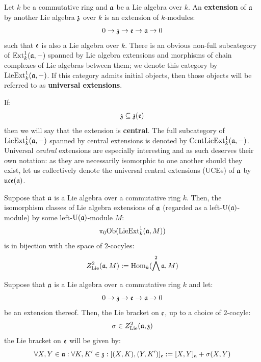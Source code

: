        \begin{definition}
            Let $k$ be a commutative ring and $\mathfrak{a}$ be a Lie algebra over $k$. An \textbf{extension} of $\mathfrak{a}$ by another Lie algebra $\mathfrak{z}$ over $k$ is an extension of $k$-modules:
                $$0 \to \mathfrak{z} \to \mathfrak{e} \to \mathfrak{a} \to 0$$
            such that $\mathfrak{e}$ is also a Lie algebra over $k$. There is an obvious non-full subcategory of $\mathrm{Ext}^1_k(\mathfrak{a}, -)$ spanned by Lie algebra extensions and morphisms of chain complexes of Lie algebras between them; we denote this category by $\mathrm{Lie}\mathrm{Ext}^1_k(\mathfrak{a}, -)$. If this category admits initial objects, then those objects will be referred to as \textbf{universal extensions}.
            
            If:
                $$\mathfrak{z} \subseteq \mathfrak{z}(\mathfrak{e})$$
            then we will say that the extension is \textbf{central}. The full subcategory of $\mathrm{Lie}\mathrm{Ext}^1_k(\mathfrak{a}, -)$ spanned by central extensions is denoted by $\mathrm{Cent}\mathrm{Lie}\mathrm{Ext}^1_k(\mathfrak{a}, -)$. Universal \textit{central} extensions are especially interesting and as such deserves their own notation: as they are necessarily isomorphic to one another should they exist, let us collectively denote the universal central extensions (UCEs) of $\mathfrak{a}$ by $\mathfrak{uce}(\mathfrak{a})$.
        \end{definition}
        \begin{lemma}[$Z^2_{\Lie}$ = all extensions]
            Suppose that $\mathfrak{a}$ is a Lie algebra over a commutative ring $k$. Then, the isomorphism classes of Lie algebra extensions of $\mathfrak{a}$ (regarded as a left-$\mathrm{U}(\mathfrak{a})$-module) by some left-$\mathrm{U}(\mathfrak{a})$-module $M$:
                $$\pi_0\mathrm{Ob}( \mathrm{Lie}\mathrm{Ext}^1_k(\mathfrak{a}, M) )$$
            is in bijection with the space of $2$-cocyles:
                $$Z^2_{\mathrm{Lie}}(\mathfrak{a}, M) := \mathrm{Hom}_k( \bigwedge^2 \mathfrak{a}, M )$$
        \end{lemma}
        \begin{corollary}[Extensions = $2$-cocycles]
            Suppose that $\mathfrak{a}$ is a Lie algebra over a commutative ring $k$ and let:
                $$0 \to \mathfrak{z} \to \mathfrak{e} \to \mathfrak{a} \to 0$$
            be an extension thereof. Then, the Lie bracket on $\mathfrak{e}$, up to a choice of $2$-cocyle:
                $$\sigma \in Z^2_{\mathrm{Lie}}(\mathfrak{a}, \mathfrak{z})$$
            the Lie bracket on $\mathfrak{e}$ will be given by:
                $$\forall X, Y \in \mathfrak{a}: \forall K, K' \in \mathfrak{z}: [ (X, K), (Y, K') ]_{\mathfrak{e}} := [X, Y]_{\mathfrak{a}} + \sigma(X, Y)$$
        \end{corollary}
